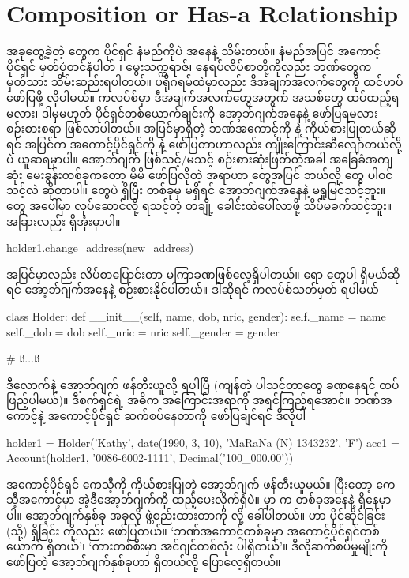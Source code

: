 \section{Composition or Has-a Relationship}
အခုတွေ့ခဲ့တဲ့   တွေက ပိုင်ရှင် နံမည်ကိုပဲ  အနေနဲ့ သိမ်းတယ်။ နံမည်အပြင် အကောင့် ပိုင်ရှင် မှတ်ပုံတင်နံပါတ် ၊ မွေးသက္ကရာဇ်၊ နေရပ်လိပ်စာတို့ကိုလည်း ဘဏ်တွေက မှတ်သား သိမ်းဆည်းရပါတယ်။ ပရိုဂရမ်ထဲမှာလည်း ဒီအချက်အလက်တွေကို ထင်ဟပ်ဖော်ပြဖို့ လိုပါမယ်။  ကလပ်စ်မှာ ဒီအချက်အလက်တွေအတွက်  အသစ်တွေ ထပ်ထည့်ရမလား၊ ဒါမှမဟုတ် ပိုင်ရှင်တစ်ယောက်ချင်းကို အော့ဘ်ဂျက်အနေနဲ့ ဖော်ပြရမလား စဉ်းစားစရာ ဖြစ်လာပါတယ်။ အပြင်မှာရှိတဲ့ ဘဏ်အကောင့်ကို   နဲ့ ကိုယ်စားပြုတယ်ဆိုရင် အပြင်က အကောင့်ပိုင်ရှင်ကို   နဲ့ ဖော်ပြတာဟာလည်း ကျိုးကြောင်းဆီလျော်တယ်လို့ပဲ ယူဆရမှာပါ။ အော့ဘ်ဂျက် ဖြစ်သင့်/မသင့် စဉ်းစားဆုံးဖြတ်တဲ့အခါ အခြေခံအကျဆုံး မေးခွန်းတစ်ခုကတော့ မိမိ ဖော်ပြလိုတဲ့ အရာဟာ  တွေအပြင် ဘယ်လို  တွေ ပါဝင်သင့်လဲ ဆိုတာပါ။  တွေပဲ ရှိပြီး  တစ်ခုမှ မရှိရင် အော့ဘ်ဂျက်အနေနဲ့ မရှုမြင်သင့်ဘူး။   တွေ အပေါ်မှာ လုပ်ဆောင်လို့ ရသင့်တဲ့  တချို့ ခေါင်းထဲပေါ်လာဖို့ သိပ်မခက်သင့်ဘူး။ အခြားလည်း ရှိအုံးမှာပါ။
%
\begin{py}
holder1.change_address(new_address)
\end{py}
%
အပြင်မှာလည်း လိပ်စာပြောင်းတာ မကြာခဏဖြစ်လေ့ရှိပါတယ်။  ရော  တွေပါ ရှိမယ်ဆိုရင် အော့ဘ်ဂျက်အနေနဲ့ စဉ်းစားနိုင်ပါတယ်။ ဒါဆိုရင် ကလပ်စ်သတ်မှတ် ရပါမယ်
%
\begin{py}
class Holder:
    def __init__(self, name, dob, nric, gender):
        self._name = name
        self._dob = dob
        self._nric = nric
        self._gender = gender

    # ß$\ldots$ß
\end{py}
%
ဒီလောက်နဲ့ အော့ဘ်ဂျက် ဖန်တီးယူလို့ ရပါပြီ (ကျန်တဲ့ ပါသင့်တာတွေ ခဏနေရင် ထပ်ဖြည့်ပါမယ်)။ ဒီစက်ရှင်ရဲ့ အဓိက အကြောင်းအရာကို အရင်ကြည့်ရအောင်။ ဘဏ်အကောင့်နဲ့ အကောင့်ပိုင်ရှင် ဆက်စပ်နေတာကို ဖော်ပြချင်ရင် ဒီလိုပါ
%
\begin{py}
holder1 = Holder('Kathy',
                 date(1990, 3, 10),
                 'MaRaNa (N) 1343232',
                 'F')
acc1 = Account(holder1, '0086-6002-1111', Decimal('100_000.00'))
\end{py}
%
အကောင့်ပိုင်ရှင် ကေသီ့ကို ကိုယ်စားပြုတဲ့ အော့ဘ်ဂျက် ဖန်တီးယူမယ်။ ပြီးတော့ ကေသီ့အကောင့်မှာ အဲ့ဒီအော့ဘ်ဂျက်ကို ထည့်ပေးလိုက်ရုံပဲ။  မှာ  က  တစ်ခုအနေနဲ့ ရှိနေမှာပါ။ အော့ဘ်ဂျက်နှစ်ခု အခုလို ဖွဲ့စည်းထားတာကို  လို့ ခေါ်ပါတယ်။  ဟာ ပိုင်ဆိုင်ခြင်း (သို့) ရှိခြင်း ကိုလည်း ဖော်ပြတယ်။  ‘ဘဏ်အကောင့်တစ်ခုမှာ အကောင့်ပိုင်ရှင်တစ်ယောက် ရှိတယ်’၊ ‘ကားတစ်စီးမှာ အင်ဂျင်တစ်လုံး ပါရှိတယ်’။  ဒီလိုဆက်စပ်မှုမျိုးကို ဖော်ပြတဲ့ အော့ဘ်ဂျက်နှစ်ခုဟာ  ရှိတယ်လို့ ပြောလေ့ရှိတယ်။

